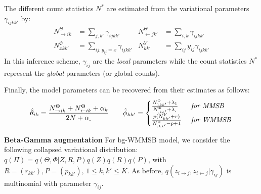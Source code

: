 The different count statistics $N^*$ are estimated from the variational parameters $\gamma_{ijkk'}$ by:
%
\begin{align} \label{eq:sss}
    N^{\Theta}_{\rightarrow ik} &= \sum_{j, k'} \gamma_{ijkk'}        & N^{\Theta}_{\leftarrow jk'} &= \sum_{i, k} \gamma_{ijkk'}  \nonumber \\
    N^{\Phi}_{xkk'} &= \sum_{ij:y_{ij}=x} \gamma_{ijkk'}  & N^{Y}_{kk'} &= \sum_{ij} y_{ij}\gamma_{ijkk'}
\end{align}
%
In this inference scheme, $\gamma_{ij}$ are the \emph{local} parameters while the count statistics $N^*$ represent the \emph{global} parameters (or global counts).  

Finally, the model parameters can be recovered from their estimates as follows:
%
\begin{align*}
\hat \theta_{ik} = \frac{N^{\Theta}_{\rightarrow ik} + N^{\Theta}_{\leftarrow ik} + \alpha_k}{2N + \alpha_{\bm{.}}} \qquad 
\hat \phi_{kk'}=\begin{cases}
     \frac{N^{\Phi}_{1 kk'} + \lambda_1}{N^{\Phi}_{\bm{.}kk'} + \lambda_{\bm{.}}} & \textrm{ \textit{for MMSB}} \\
    \frac{p(N^Y_{kk'} + r)}{N^{\Phi}_{\bm{.}kk'} - p + 1}  & \textrm{ \textit{for WMMSB}}  %
    \end{cases}
\end{align*}

\textbf{Beta-Gamma augmentation} For bg-WMMSB model, we consider the following collapsed variational distribution: $q(\Pi) = q(\Theta, \Phi|Z, R, P)q(Z)q(R)q(P)$,
with $R=(r_{kk'}), P=(p_{kk'}), \, 1 \le k,k' \le K$. As before, $q(z_{i \rightarrow j}, z_{i \leftarrow j}|\gamma_{ij})$ is multinomial with parameter $\gamma_{ij}$. 

